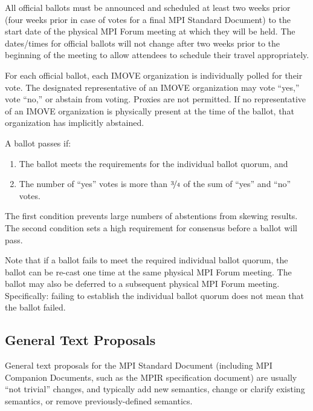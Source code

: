 All official ballots must be announced and scheduled at least two
weeks prior (four weeks prior in case of votes for a final MPI Standard
Document) to the start date of the physical MPI Forum meeting at
which they will be held.  The dates/times for official ballots will
not change after two weeks prior to the beginning of the meeting to
allow attendees to schedule their travel appropriately.

For each official ballot, each IMOVE organization is individually
polled for their vote.  The designated representative of an IMOVE
organization may vote ``yes,'' vote ``no,'' or abstain from voting.
Proxies are not permitted.  If no representative of an IMOVE
organization is physically present at the time of the ballot, that
organization has implicitly abstained.

A ballot passes if:

\begin{enumerate}
\item The ballot meets the requirements for the individual ballot
  quorum, and
\item The number of ``yes'' votes is more than $\nicefrac{3}{4}$ of
  the sum of ``yes'' and ``no'' votes.
\end{enumerate}

\begin{rationale}
  The first condition prevents large numbers of abstentions from
  skewing results.  The second condition sets a high requirement for
  consensus before a ballot will pass.
\end{rationale}

Note that if a ballot fails to meet the required individual ballot
quorum, the ballot can be re-cast one time at the same physical MPI
Forum meeting.  The ballot may also be deferred to a subsequent
physical MPI Forum meeting.  Specifically: failing to establish the
individual ballot quorum does not mean that the ballot failed.


\subsection{General Text Proposals}
\label{subsec:general-text-proposals}

General text proposals for the MPI Standard Document (including
MPI Companion Documents, such as the MPIR specification
document) are usually ``not trivial'' changes, and typically add new
semantics, change or clarify existing semantics, or remove
previously-defined semantics.

